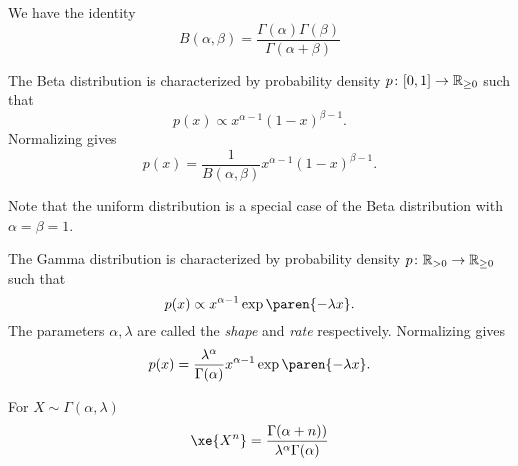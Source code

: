 \documentclass{article}
\begin{document}
We have the identity
\[
B(\alpha, \beta)
= \frac{\Gamma(\alpha) \Gamma(\beta)}{\Gamma(\alpha + \beta)}
\]

The Beta distribution is characterized by probability density $p \colon [0, 1] \to \mathbb{R}_{\ge 0}$ such that
\[
p(x) \propto x^{\alpha - 1} (1-x)^{\beta - 1}.
\]
Normalizing gives
\[
p(x) = \frac{1}{B(\alpha, \beta)} x^{\alpha - 1} (1-x)^{\beta - 1}.
\]

Note that the uniform distribution is a special case of the Beta distribution with $\alpha = \beta = 1$.


The Gamma distribution is characterized by probability density $p \colon \mathbb{R}_{>0} \to \mathbb{R}_{\ge 0}$ such that
\[
p(x) \propto x^{\alpha - 1} \exp\paren{-\lambda x}.
\]
The parameters $\alpha, \lambda$ are called the \emph{shape} and \emph{rate} respectively. Normalizing gives
\[
p(x) = \frac{\lambda^{\alpha}}{\Gamma(\alpha)} x^{\alpha - 1} \exp\paren{-\lambda x}.
\]

For $X \sim \Gamma(\alpha, \lambda)$
\[
\xe{X^n}
= \frac{\Gamma(\alpha + n))}{\lambda^{\alpha} \Gamma(\alpha)}
\]
\end{document}
